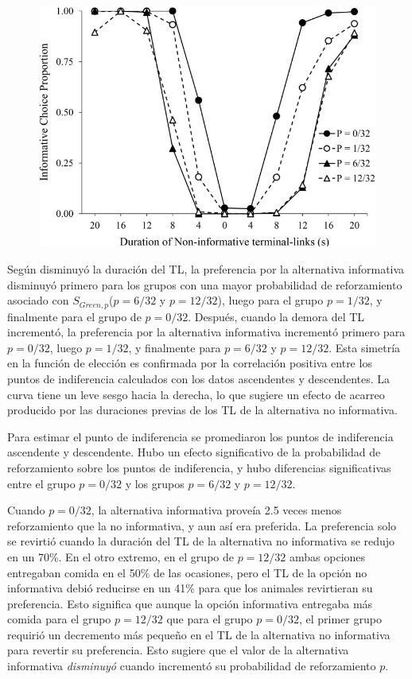 \documentclass[a4paper,12pt]{article}
\begin{document}
\begin{figure}[ht]
	\begin{center}
		\includegraphics[scale=0.3]{Fortes2018(2).png}
	\end{center}
\end{figure}

Según disminuyó la duración del TL, la preferencia por la alternativa informativa disminuyó primero para los grupos con una mayor probabilidad de reforzamiento asociado con $S_{Green,p}$($p=6/32$ y $p=12/32$), luego para el grupo $p=1/32$, y finalmente para el grupo de $p=0/32$. Después, cuando la demora del TL incrementó, la preferencia por la alternativa informativa incrementó primero para $p=0/32$, luego $p=1/32$, y finalmente para $p=6/32$ y $p=12/32$. Esta simetría en la función de elección es confirmada por la correlación positiva entre los puntos de indiferencia calculados con los datos ascendentes y descendentes. La curva tiene un leve sesgo hacia la derecha, lo que sugiere un efecto de acarreo producido por las duraciones previas de los TL de la alternativa no informativa.

Para estimar el punto de indiferencia se promediaron los puntos de indiferencia ascendente y descendente. Hubo un efecto significativo de la probabilidad de reforzamiento sobre los puntos de indiferencia, y hubo diferencias significativas entre el grupo $p=0/32$ y los grupos $p=6/32$ y $p=12/32$.

Cuando $p=0/32$, la alternativa informativa proveía 2.5 veces menos reforzamiento que la no informativa, y aun así era preferida. La preferencia solo se revirtió cuando la duración del TL de la alternativa no informativa se redujo en un 70\%. En el otro extremo, en el grupo de $p=12/32$ ambas opciones entregaban comida en el 50\% de las ocasiones, pero el TL de la opción no informativa debió reducirse en un 41\% para que los animales revirtieran su preferencia. Esto significa que aunque la opción informativa entregaba más comida para el grupo $p=12/32$ que para el grupo $p=0/32$, el primer grupo requirió un decremento más pequeño en el TL de la alternativa no informativa para revertir su preferencia. Esto sugiere que el valor de la alternativa informativa {\itshape disminuyó} cuando incrementó su probabilidad de reforzamiento $p$.
\end{document}
